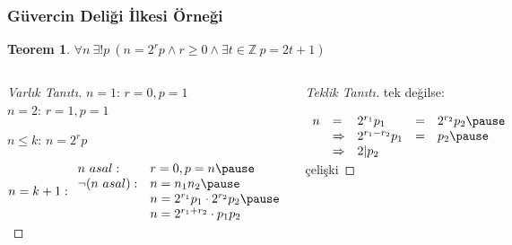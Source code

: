 \documentclass[dvipsnames]{beamer}
\theoremstyle{definition}
\theoremstyle{example}
\theoremstyle{plain}
\newtheorem{teorem}[theorem]{Teorem}
\begin{document}
\begin{frame}
  \frametitle{Güvercin Deliği İlkesi Örneği}

  \begin{teorem}
    $\forall n~\exists ! p~
      (n = 2^r p \wedge r \geq 0 \wedge \exists t \in \mathbb Z~p = 2t + 1)$\\
  \end{teorem}

  \pause
  \begin{columns}[t]
    \begin{proof}[Varlık Tanıtı]
      $n = 1$: $r = 0, p = 1$\\
      $n = 2$: $r = 1, p = 1$

      \pause
      $n \leq k$: $n = 2^r p$

      \pause
      $n = k + 1:
      \begin{array}{ll}
         n~asal:        & r = 0, p = n\pause\\
         \neg (n~asal): & n = n_1 n_2\pause\\
                        & n = 2^{r_1} p_1 \cdot 2^{r_2} p_2\pause\\
                        & n = 2^{r_1+r_2} \cdot p_1 p_2
      \end{array}$
    \end{proof}

    \pause
    \begin{proof}[Teklik Tanıtı]
      tek değilse:

      \pause
      $\begin{array}{lllll}
        n & =           & 2^{r_1} p_1     & = & 2^{r_2} p_2\pause\\
          & \Rightarrow & 2^{r_1-r_2} p_1 & = & p_2\pause\\
          & \Rightarrow & 2 | p_2
      \end{array}$
      \alert{çelişki}
    \end{proof}
  \end{columns}
\end{frame}
\end{document}
